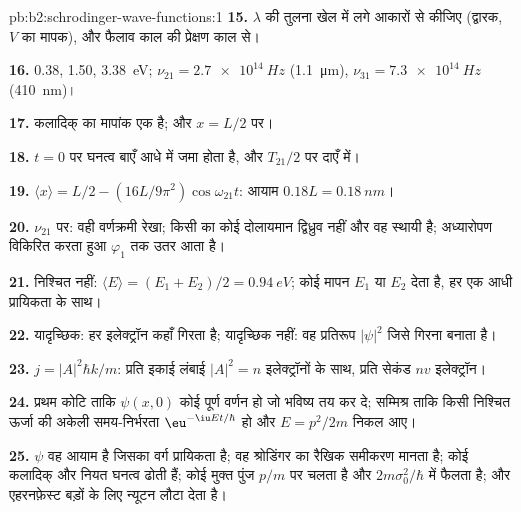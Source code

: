 \begin{solution}{pb:b2:schrodinger-wave-functions:1}
\textbf{15.} $\lambda$ की तुलना खेल में लगे आकारों से कीजिए (द्वारक, $V$
का मापक), और फैलाव काल की प्रेक्षण काल से।

\textbf{16.} \qty{0.38}{}, \qty{1.50}{}, \qty{3.38}{eV}; $\nu_{21} = \qty{2.7e14}{Hz}$
(\qty{1.1}{\micro m}), $\nu_{31} = \qty{7.3e14}{Hz}$ (\qty{410}{nm})।

\textbf{17.} कलादिक् का मापांक एक है; और $x = L/2$ पर।

\textbf{18.} $t = 0$ पर घनत्व बाएँ आधे में जमा होता है, और
$T_{21}/2$ पर दाएँ में।

\textbf{19.} $\langle x\rangle = L/2 - (16L/9\pi^2)\cos\omega_{21}t$: आयाम
$0.18L = \qty{0.18}{nm}$।

\textbf{20.} $\nu_{21}$ पर: वही वर्णक्रमी रेखा; किसी  का कोई
दोलायमान द्विध्रुव नहीं और वह स्थायी है; अध्यारोपण विकिरित करता हुआ
$\varphi_1$ तक उतर आता है।

\textbf{21.} निश्चित नहीं: $\langle E\rangle = (E_1 + E_2)/2 = \qty{0.94}{eV}$; कोई
मापन $E_1$ या $E_2$ देता है, हर एक आधी प्रायिकता के साथ।

\textbf{22.} यादृच्छिक: हर इलेक्ट्रॉन कहाँ गिरता है; यादृच्छिक नहीं: वह
प्रतिरूप $|\psi|^2$ जिसे गिरना बनाता है।

\textbf{23.} $j = |A|^2\hbar k/m$: प्रति इकाई लंबाई $|A|^2 = n$ इलेक्ट्रॉनों के साथ,
प्रति सेकंड $nv$ इलेक्ट्रॉन।

\textbf{24.} प्रथम कोटि ताकि $\psi(x,0)$ कोई पूर्ण वर्णन हो
जो भविष्य तय कर दे; सम्मिश्र ताकि किसी निश्चित ऊर्जा की
अकेली समय-निर्भरता $\eu^{-\iu Et/\hbar}$ हो और $E = p^2/2m$ निकल आए।

\textbf{25.} $\psi$ वह आयाम है जिसका वर्ग प्रायिकता है; वह
श्रोडिंगर का रैखिक समीकरण मानता है;  कोई कलादिक् और
नियत घनत्व ढोती हैं; कोई मुक्त पुंज $p/m$ पर चलता है और
$2m\sigma_0^2/\hbar$ में फैलता है; और एहरनफ़ेस्ट बड़ों के लिए न्यूटन लौटा देता है।
\end{solution}

